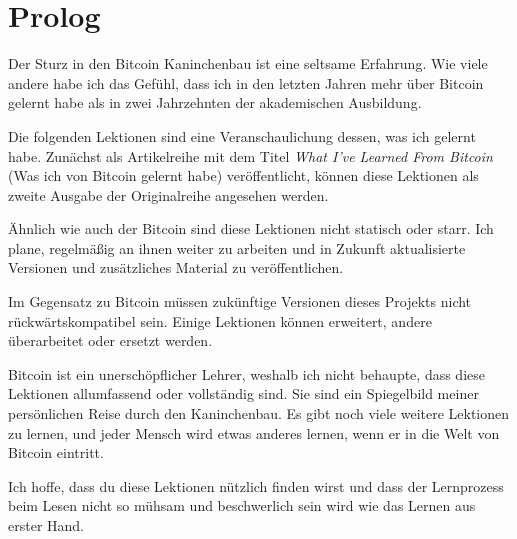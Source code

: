 \chapter*{Prolog}
Der Sturz in den Bitcoin Kaninchenbau ist eine seltsame Erfahrung. Wie viele
andere habe ich das Gefühl, dass ich in den letzten Jahren mehr über Bitcoin
gelernt habe als in zwei Jahrzehnten der akademischen Ausbildung.

Die folgenden Lektionen sind eine Veranschaulichung dessen, was ich gelernt
habe. Zunächst als Artikelreihe mit dem Titel \textit{What I’ve Learned From
Bitcoin} (Was ich von Bitcoin gelernt habe) veröffentlicht, können diese
Lektionen als zweite Ausgabe der Originalreihe angesehen werden.

Ähnlich wie auch der Bitcoin sind diese Lektionen nicht statisch oder starr. Ich
plane, regelmäßig an ihnen weiter zu arbeiten und in Zukunft aktualisierte
Versionen und zusätzliches Material zu veröffentlichen.

Im Gegensatz zu Bitcoin müssen zukünftige Versionen dieses Projekts nicht
rückwärtskompatibel sein. Einige Lektionen können erweitert, andere überarbeitet
oder ersetzt werden.

Bitcoin ist ein unerschöpflicher Lehrer, weshalb ich nicht behaupte, dass diese
Lektionen allumfassend oder vollständig sind. Sie sind ein Spiegelbild meiner
persönlichen Reise durch den Kaninchenbau. Es gibt noch viele weitere Lektionen
zu lernen, und jeder Mensch wird etwas anderes lernen, wenn er in die Welt von
Bitcoin eintritt.

Ich hoffe, dass du diese Lektionen nützlich finden wirst und dass der
Lernprozess beim Lesen nicht so mühsam und beschwerlich sein wird wie das Lernen
aus erster Hand.

%
%
